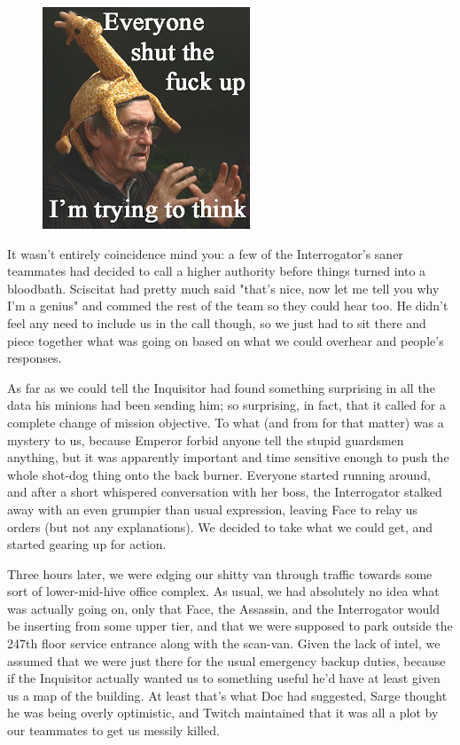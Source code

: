 \begin{figure}
	\begin{center}
		\includegraphics[width=\figwidth]{pics/17/36.png}
	\end{center}
\end{figure}
It wasn't entirely coincidence mind you: 
a few of the Interrogator's saner teammates had decided to call a higher authority before things turned into a bloodbath. 
Sciscitat had pretty much said "that's nice, now let me tell you why I'm a genius" and commed the rest of the team so they could hear too. 
He didn't feel any need to include us in the call though, so we just had to sit there and piece together what was going on based on what we could overhear and people's responses. 


As far as we could tell the Inquisitor had found something surprising in all the data his minions had been sending him; 
so surprising, in fact, that it called for a complete change of mission objective. 
To what (and from for that matter) was a mystery to us, because Emperor forbid anyone tell the stupid guardsmen anything, but it was apparently important and time sensitive enough to push the whole shot-dog thing onto the back burner. 
Everyone started running around, and after a short whispered conversation with her boss, the Interrogator stalked away with an even grumpier than usual expression, leaving Face to relay us orders (but not any explanations). 
We decided to take what we could get, and started gearing up for action.

Three hours later, we were edging our shitty van through traffic towards some sort of lower-mid-hive office complex. 
As usual, we had absolutely no idea what was actually going on, only that Face, the Assassin, and the Interrogator would be inserting from some upper tier, and that we were supposed to park outside the 247th floor service entrance along with the scan-van. 
Given the lack of intel, we assumed that we were just there for the usual emergency backup duties, because if the Inquisitor actually wanted us to something useful he'd have at least given us a map of the building. 
At least that's what Doc had suggested, Sarge thought he was being overly optimistic, and Twitch maintained that it was all a plot by our teammates to get us messily killed.

